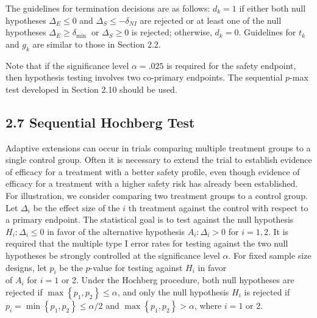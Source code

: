 \documentclass[10pt]{article}
\begin{document}
The guidelines for termination decisions are as follows: $d_{k}=1$ if either both null hypotheses $\Delta_{E} \leq 0$ and $\Delta_{S} \leq-\delta_{N I}$ are rejected or at least one of the null hypotheses $\Delta_{E} \geq \delta_{\text {min }}$ or $\Delta_{S} \geq 0$ is rejected; otherwise, $d_{k}=0$. Guidelines for $t_{k}$ and $g_{k}$ are similar to those in Section 2.2.

Note that if the significance level $\alpha=.025$ is required for the safety endpoint, then hypothesis testing involves two co-primary endpoints. The sequential $p$-max test developed in Section 2.10 should be used.

\subsection*{2.7 Sequential Hochberg Test}
Adaptive extensions can occur in trials comparing multiple treatment groups to a single control group. Often it is necessary to extend the trial to establish evidence of efficacy for a treatment with a better safety profile, even though evidence of efficacy for a treatment with a higher safety risk has already been established. For illustration, we consider comparing two treatment groups to a control group. Let $\Delta_{i}$ be the effect size of the $i$ th treatment against the control with respect to a primary endpoint. The statistical goal is to test against the null hypothesis $H_{i}: \Delta_{i} \leq 0$ in favor of the alternative hypothesis $A_{i}: \Delta_{i}>0$ for $i=1,2$. It is required that the multiple type I error rates for testing against the two null hypotheses be strongly controlled at the significance level $\alpha$. For fixed sample size designs, let $p_{i}$ be the $p$-value for testing against $H_{i}$ in favor\\
of $A_{i}$ for $i=1$ or 2. Under the Hochberg procedure, both null hypotheses are rejected if $\max \left\{p_{1}, p_{2}\right\} \leq \alpha$, and only the null hypothesis $H_{i}$ is rejected if $p_{i}=\min \left\{p_{1}, p_{2}\right\} \leq \alpha / 2$ and $\max \left\{p_{1}, p_{2}\right\}>\alpha$, where $i=1$ or 2.
\end{document}
